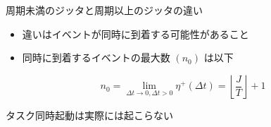 \begin{frame}{周期未満のジッタと周期以上のジッタの違い}
    \begin{itemize}
        \item 違いはイベントが同時に到着する可能性があること
        \item 同時に到着するイベントの最大数 $\left(n_{0}\right)$ は以下
    \end{itemize}
    \begin{equation*}
        n_{0}=\lim _{\Delta t \rightarrow 0, \Delta t>0} \eta^{+}(\Delta t)=\left\lfloor\frac{J}{T}\right\rfloor+1
    \end{equation*}
\end{frame}


\begin{frame}{タスク同時起動は実際には起こらない}
\end{frame}


